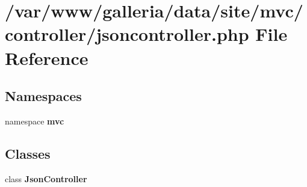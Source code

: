\section{/var/www/galleria/data/site/mvc/controller/jsoncontroller.php File Reference}
\label{jsoncontroller_8php}
\subsection*{Namespaces}
\begin{CompactItemize}
\item 
namespace {\bf mvc}
\end{CompactItemize}
\subsection*{Classes}
\begin{CompactItemize}
\item 
class {\bf JsonController}
\end{CompactItemize}
